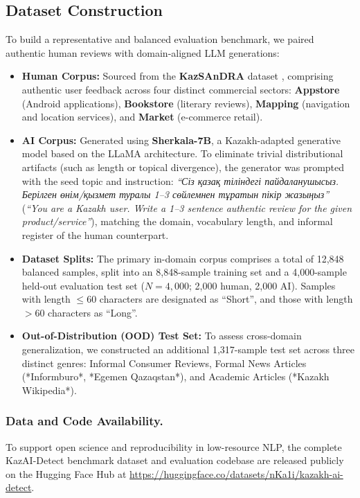 \documentclass[runningheads]{llncs}
\begin{document}
\subsection{Dataset Construction}
To build a representative and balanced evaluation benchmark, we paired authentic human reviews with domain-aligned LLM generations:
\begin{itemize}
\item \textbf{Human Corpus:} Sourced from the \textbf{KazSAnDRA} dataset \cite{1}, comprising authentic user feedback across four distinct commercial sectors: \textbf{Appstore} (Android applications), \textbf{Bookstore} (literary reviews), \textbf{Mapping} (navigation and location services), and \textbf{Market} (e-commerce retail).
\item \textbf{AI Corpus:} Generated using \textbf{Sherkala-7B}, a Kazakh-adapted generative model based on the LLaMA architecture. To eliminate trivial distributional artifacts (such as length or topical divergence), the generator was prompted with the seed topic and instruction: \textit{``Сіз қазақ тіліндегі пайдаланушысыз. Берілген өнім/қызмет туралы 1--3 сөйлемнен тұратын пікір жазыңыз''} (\textit{``You are a Kazakh user. Write a 1--3 sentence authentic review for the given product/service''}), matching the domain, vocabulary length, and informal register of the human counterpart.
\item \textbf{Dataset Splits:} The primary in-domain corpus comprises a total of 12,848 balanced samples, split into an 8,848-sample training set and a 4,000-sample held-out evaluation test set ($N = 4,000$; 2,000 human, 2,000 AI). Samples with length $\le 60$ characters are designated as ``Short'', and those with length $> 60$ characters as ``Long''.
\item \textbf{Out-of-Distribution (OOD) Test Set:} To assess cross-domain generalization, we constructed an additional 1,317-sample test set across three distinct genres: Informal Consumer Reviews, Formal News Articles (*Informburo*, *Egemen Qazaqstan*), and Academic Articles (*Kazakh Wikipedia*).
\end{itemize}

\subsubsection{Data and Code Availability.}
To support open science and reproducibility in low-resource NLP, the complete KazAI-Detect benchmark dataset and evaluation codebase are released publicly on the Hugging Face Hub at \url{https://huggingface.co/datasets/nKa1i/kazakh-ai-detect}.
\end{document}
